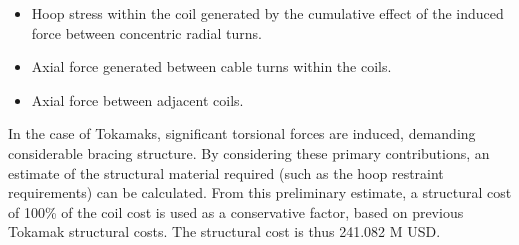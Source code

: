 \begin{itemize}
    \item Hoop stress within the coil generated by the cumulative effect of the induced force between concentric radial turns.
    \item Axial force generated between cable turns within the coils. 
    \item Axial force between adjacent coils.
\end{itemize}


In the case of Tokamaks, significant torsional forces are induced, demanding considerable bracing structure. By considering these primary contributions, an estimate of the structural material required (such as the hoop restraint requirements) can be calculated. From this preliminary estimate, a structural cost of 100\% of the coil cost is used as a conservative factor, based on previous Tokamak structural costs. The structural cost is thus 241.082 M USD.


